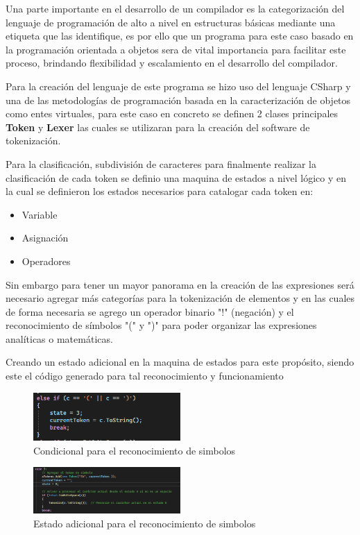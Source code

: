 \documentclass[conference]{IEEEtran}
\begin{document}
	Una parte importante en el desarrollo de un compilador es la categorización del lenguaje de programación de alto a nivel en estructuras básicas mediante una etiqueta que las identifique, es por ello que un programa para este caso basado en la programación orientada a objetos sera de vital importancia para facilitar este proceso, brindando flexibilidad y escalamiento en el desarrollo del compilador.
	
	Para la creación del lenguaje de este programa se hizo uso del lenguaje CSharp y una de las metodologías de programación basada en la caracterización de objetos como entes virtuales, para este caso en concreto se definen 2 clases principales \textbf{Token} y \textbf{Lexer} las cuales se utilizaran para la creación del software de tokenización.
	
	Para la clasificación, subdivisión de caracteres para finalmente realizar la clasificación de cada token se definio una maquina de estados a nivel lógico y en la cual se definieron los estados necesarios para catalogar cada token en:
	\begin{itemize}
		\item Variable
		\item Asignación
		\item Operadores
	\end{itemize}
	
	Sin embargo para tener un mayor panorama en la creación de las expresiones será necesario agregar más categorías para la tokenización de elementos y en las cuales de forma necesaria se agrego un operador binario "!" (negación) y el reconocimiento de símbolos "(" y ")" para poder organizar las expresiones analíticas o matemáticas.
	
	Creando un estado adicional en la maquina de estados para este propósito, siendo este el código generado para tal reconocimiento y funcionamiento
	\begin{figure}[h]
		\centering
		\includegraphics[width=0.5\textwidth]{media/con-simbolos}
		\caption{Condicional para el reconocimiento de simbolos}
		\label{fig:con-simbolos}
	\end{figure}
	
	\begin{figure}[h]
		\centering
		\includegraphics[width=0.5\textwidth]{media/simbolos-estado}
		\caption{Estado adicional para el reconocimiento de simbolos}
		\label{fig:simbolos-estado}
	\end{figure}
	
\end{document}
